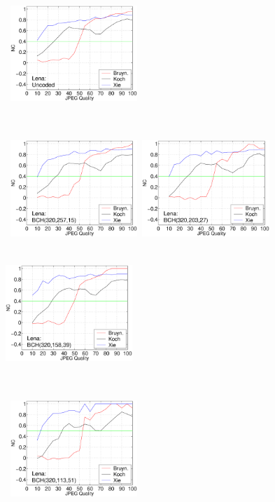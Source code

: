 \documentclass[12pt]{report}
\begin{document}
\begin{figure}[p]
\centerline{\hbox{
        \includegraphics[height=4.6cm,width=4.8cm]{BKX_EPS_formattedBetter/Lena320_320_1.eps}\\
}}
\centerline{\hbox{
        \includegraphics[height=4.6cm,width=4.8cm]{BKX_EPS_formattedBetter/Lena320_257_15.eps}
        \includegraphics[height=4.6cm,width=4.8cm]{BKX_EPS_formattedBetter/Lena320_203_27.eps}
        \includegraphics[height=4.6cm,width=4.8cm]{BKX_EPS_formattedBetter/Lena320_158_39.eps}\\
}}
\centerline{ \hbox{
        \includegraphics[height=4.6cm,width=4.8cm]{BKX_EPS_formattedBetter/Lena320_113_51.eps}
}}
\end{figure}
\end{document}
